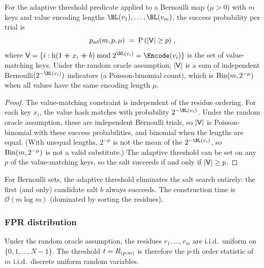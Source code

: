 \begin{theorem}
\label{thm:success_adaptive_map}
For the adaptive threshold predicate applied to a Bernoulli map ($\mu > 0$)
with $m$ keys and value encoding lengths $\BL(v_1),\ldots,\BL(v_m)$, the
success probability per trial is
\begin{equation}
\label{eq:success_adaptive_map}
    p_{\mathrm{ad}}(m, p, \mu)
    \;=\; \Prob{\Card{\Set{V}} \geq p}\,,
\end{equation}
where $\Set{V} = \{i : \hash(1 \cat x_i \cat b) \bmod 2^{\BL(v_i)} =
\Encode(v_i)\}$ is the set of value-matching keys.
Under the random oracle assumption, $\Card{\Set{V}}$ is a sum of independent
Bernoulli$(2^{-\BL(v_i)})$ indicators (a Poisson-binomial count), which is
$\mathrm{Bin}(m, 2^{-\mu})$ when all values have the same encoding length $\mu$.
\end{theorem}
\begin{proof}
The value-matching constraint is independent of the residue ordering.
For each key $x_i$, the value hash matches with probability $2^{-\BL(v_i)}$.
Under the random oracle assumption, these are independent Bernoulli trials, so
$\Card{\Set{V}}$ is Poisson-binomial with these success probabilities, and
binomial when the lengths are equal.
(With unequal lengths, $2^{-\mu}$ is not the mean of the $2^{-\BL(v_i)}$, so
$\mathrm{Bin}(m, 2^{-\mu})$ is not a valid substitute.)
The adaptive threshold can be set on any $p$ of the value-matching keys, so the
salt succeeds if and only if $\Card{\Set{V}} \geq p$.
\end{proof}

\begin{corollary}
\label{cor:adaptive_no_search}
For Bernoulli sets, the adaptive threshold eliminates the salt search entirely:
the first (and only) candidate salt $b$ always succeeds.
The construction time is $\mathcal{O}(m \log m)$ (dominated by sorting the
residues).
\end{corollary}

\subsubsection{FPR distribution}

Under the random oracle assumption, the residues $r_1,\ldots,r_m$ are i.i.d.\
uniform on $\{0,1,\ldots,N-1\}$.
The threshold $t = R_{(p:m)}$ is therefore the $p$-th order statistic of $m$
i.i.d.\ discrete uniform random variables.

